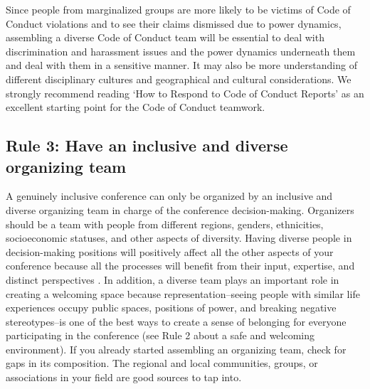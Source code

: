 \documentclass[10pt,letterpaper]{article}
\begin{document}
Since people from marginalized groups are more likely to be victims of Code of Conduct violations and to see their claims dismissed due to power dynamics, assembling a diverse Code of Conduct team will be essential to deal with discrimination and harassment issues and the power dynamics underneath them and deal with them in a sensitive manner. It may also be more understanding of different disciplinary cultures and geographical and cultural considerations. 
We strongly recommend reading `How to Respond to Code of Conduct Reports' \cite{auroraHowRespondCode2019} as an excellent starting point for the Code of Conduct teamwork.
 


\subsection*{Rule 3: Have an inclusive and diverse organizing team}
\label{rule_organizing_team}


A genuinely inclusive conference can only be organized by an inclusive and diverse organizing team in charge of the conference decision-making.
Organizers should be a team with people from different regions, genders, ethnicities, socioeconomic statuses, and other aspects of diversity.
Having diverse people in decision-making positions will positively affect all the other aspects of your conference because all the processes will benefit from their input, expertise, and distinct perspectives \cite{hongGroupsDiverseProblem2004}. 
In addition, a diverse team plays an important role in creating a welcoming space because representation--seeing people with similar life experiences occupy public spaces, positions of power, and breaking negative stereotypes--is one of the best ways to create a sense of belonging for everyone participating in the conference (see Rule 2 about a safe and welcoming environment). If you already started assembling an organizing team, check for gaps in its composition. 
The regional and local communities, groups, or associations in your field are good sources to tap into. 
\end{document}
